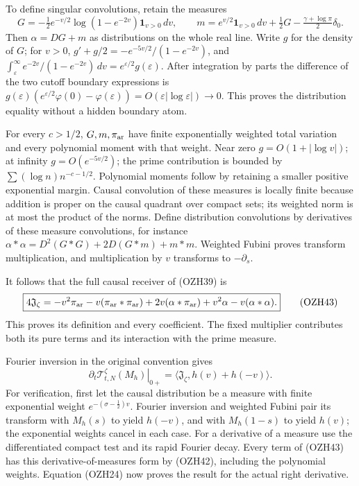\documentclass[
  10pt,
  a4paper,
]{article}
\begin{document}
To define singular convolutions, retain the measures \[
G=-\tfrac12e^{-v/2}\log(1-e^{-2v})\mathbf1_{v>0}\,dv,\qquad
m=e^{v/2}\mathbf1_{v>0}\,dv+\tfrac12G
-\tfrac{\gamma+\log\pi}{2}\delta_0 .
\tag{OZH42}
\] Then \(\alpha=DG+m\) as distributions on the whole real line. Write
\(g\) for the density of \(G\); for \(v>0\),
\(g'+g/2=-e^{-5v/2}/(1-e^{-2v})\), and
\(\int_\varepsilon^\infty e^{-2v}/(1-e^{-2v})\,dv
=e^{\varepsilon/2}g(\varepsilon)\). After integration by parts the
difference of the two cutoff boundary expressions is
\(g(\varepsilon)(e^{\varepsilon/2}\varphi(0)-\varphi(\varepsilon))
=O(\varepsilon|\log\varepsilon|)\to0\). This proves the distribution
equality without a hidden boundary atom.

For every \(c>1/2\), \(G,m,\pi_{\rm ar}\) have finite exponentially
weighted total variation and every polynomial moment with that weight.
Near zero \(g=O(1+|\log v|)\); at infinity \(g=O(e^{-5v/2})\); the prime
contribution is bounded by \(\sum(\log n)n^{-c-1/2}\). Polynomial
moments follow by retaining a smaller positive exponential margin.
Causal convolution of these measures is locally finite because addition
is proper on the causal quadrant over compact sets; its weighted norm is
at most the product of the norms. Define distribution convolutions by
derivatives of these measure convolutions, for instance
\(\alpha*\alpha=D^2(G*G)+2D(G*m)+m*m\). Weighted Fubini proves transform
multiplication, and multiplication by \(v\) transforms to
\(-\partial_s\).

It follows that the full causal receiver of (OZH39) is \[
\boxed{
4\mathfrak J_\zeta=
-v^2\pi_{\rm ar}-v(\pi_{\rm ar}*\pi_{\rm ar})
+2v(\alpha*\pi_{\rm ar})
+v^2\alpha-v(\alpha*\alpha).}
\tag{OZH43}
\] This proves its definition and every coefficient. The fixed
multiplier contributes both its pure terms and its interaction with the
prime measure.

Fourier inversion in the original convention gives \[
\left.\partial_t\mathcal T_{t,N}^\zeta(M_h)\right|_{0+}
=\langle\mathfrak J_\zeta,h(v)+h(-v)\rangle .
\tag{OZH44}
\] For verification, first let the causal distribution be a measure with
finite exponential weight \(e^{-(\sigma-\frac12)v}\). Fourier inversion
and weighted Fubini pair its transform with \(M_h(s)\) to yield
\(h(-v)\), and with \(M_h(1-s)\) to yield \(h(v)\); the exponential
weights cancel in each case. For a derivative of a measure use the
differentiated compact test and its rapid Fourier decay. Every term of
(OZH43) has this derivative-of-measures form by (OZH42), including the
polynomial weights. Equation (OZH24) now proves the result for the
actual right derivative.
\end{document}
